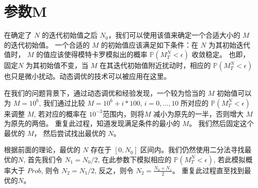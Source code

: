 
\section{参数M} %
\label{sec:M}
在确定了 $N$ 的迭代初始值之后 $N_0$，我们可以使用该值来确定一个合适大小的 $M$ 的迭代初始值。
一个合适的 $M$ 的初始值应该满足如下条件：在 $N$ 为其初始迭代值时， $M$ 的值应该使得模特卡罗模拟出的概率 $\mathbb{P}(M_T^N<\epsilon)$ 收敛稳定。
也即，固定$N$ 为其初始值不变，当 $M$ 在其迭代初始值附近扰动时，相应的 $\mathbb{P}(M_T^N<\epsilon)$ 也只是微小扰动。动态调优的技术可以被应用在这里。

在我们的问题背景下，通过动态调优和经验发现，一个较为恰当的 $M$ 初始值可以为 $M=10^6$, 我们通过比较 $M=10^6+i*100$, $i=0,...,10$ 
所对应的 $\mathbb{P}(M_T^N<\epsilon)$来调整 $M$, 若对应的概率在 $10^{-3}$范围内，则将$M$ 减小为原先的一半，否则增大 $M$ 为原先的两倍。
重复此过程，知道发现满足条件的最小的 $M$。 我们然后固定这个最优的 $M$， 然后尝试找出最优的 $N$。

根据前面的理论，最优的 $N$ 存在于 $[0, N_0]$ 区间内。我们仍然使用二分法寻找最优的$N$, 首先我们令 $N_1=N_0/2$, 在此参数下模拟相应的
$\mathbb{P}(M_T^N<\epsilon)$, 若此模拟概率大于 $Prob$, 则令 $N_2=N_1/2$, 反之，则令 $N_2=\frac{N_0+N_1}{2}$。
重复此过程直至找到最优的$N$。





